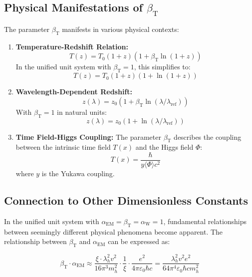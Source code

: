 \documentclass[12pt,a4paper]{article}
\newcommand{\Tfield}{T(x)}
\newcommand{\betaT}{\beta_{\text{T}}}
\newcommand{\alphaEM}{\alpha_{\text{EM}}}
\newcommand{\alphaW}{\alpha_{\text{W}}}
\begin{document}
	\subsection{Physical Manifestations of \(\betaT\)}
	
	The parameter \(\betaT\) manifests in various physical contexts:
	
	\begin{enumerate}
		\item \textbf{Temperature-Redshift Relation:} 
		\begin{equation}
			T(z) = T_0 (1 + z) (1 + \betaT \ln(1 + z))
		\end{equation}
		In the unified unit system with \(\betaT = 1\), this simplifies to:
		\begin{equation}
			T(z) = T_0 (1 + z) (1 + \ln(1 + z))
		\end{equation}
		\item \textbf{Wavelength-Dependent Redshift:} 
		\begin{equation}
			z(\lambda) = z_0 (1 + \betaT \ln(\lambda/\lambda_{\text{ref}}))
		\end{equation}
		With \(\betaT = 1\) in natural units:
		\begin{equation}
			z(\lambda) = z_0 (1 + \ln(\lambda/\lambda_{\text{ref}}))
		\end{equation}
		\item \textbf{Time Field-Higgs Coupling:} The parameter \(\betaT\) describes the coupling between the intrinsic time field \(\Tfield\) and the Higgs field \(\Phi\):
		\begin{equation}
			\Tfield = \frac{\hbar}{y \langle \Phi \rangle c^2}
		\end{equation}
		where \(y\) is the Yukawa coupling.
	\end{enumerate}
	
	\subsection{Connection to Other Dimensionless Constants}
	
	In the unified unit system with \(\alphaEM = \betaT = \alphaW = 1\), fundamental relationships between seemingly different physical phenomena become apparent. The relationship between \(\betaT\) and \(\alphaEM\) can be expressed as:
	
	\begin{equation}
		\betaT \cdot \alphaEM \approx \frac{\xi \cdot \lambda_h^2 v^2}{16\pi^3 m_h^2} \cdot \frac{1}{\xi} \cdot \frac{e^2}{4\pi\varepsilon_0\hbar c} = \frac{\lambda_h^2 v^2 e^2}{64\pi^4\varepsilon_0\hbar c m_h^2}
	\end{equation}
	
\end{document}
